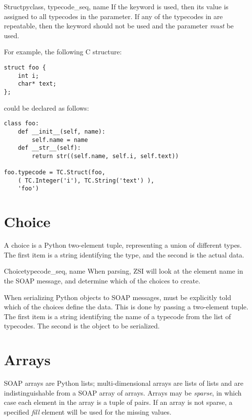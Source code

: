 \begin{classdesc}{Struct}{pyclass, typecode_seq, name}
If the  keyword is used, then its value is assigned to
all typecodes in the  parameter.
If any of the typecodes in  are repeatable, then the
 keyword should not be used and the  parameter
\emph{must} be used.

For example, the following C structure:
\begin{verbatim}
struct foo {
    int i;
    char* text;
};
\end{verbatim}
could be declared as follows:
\begin{verbatim}
class foo:
    def __init__(self, name):
        self.name = name
    def __str__(self):
        return str((self.name, self.i, self.text))

foo.typecode = TC.Struct(foo,
    ( TC.Integer('i'), TC.String('text') ),
    'foo')
\end{verbatim}
\end{classdesc}

\section{Choice}

A choice is a Python two-element  tuple, representing
a union of different types.
The first item is a string identifying the type, and the second is the
actual data.

\begin{classdesc}{Choice}{typecode_seq, name}
When parsing, ZSI will look at the element name in the SOAP message, and
determine which of the choices to create.

When serializing Python objects to SOAP messages, \ZSI{} must be
explicitly told which of the choices define the data.
This is done by passing a two-element tuple.
The first item is a string identifying the name of a typecode
from the  list of typecodes.
The second is the object to be serialized.
\end{classdesc}

\section{Arrays}

SOAP arrays are Python lists; multi-dimensional arrays are
lists of lists and are indistinguishable from a SOAP array of arrays.
Arrays may be \emph{sparse}, in which case each element in the
array is a tuple of  pairs.
If an array is not sparse, a specified \emph{fill} element will be
used for the missing values.

